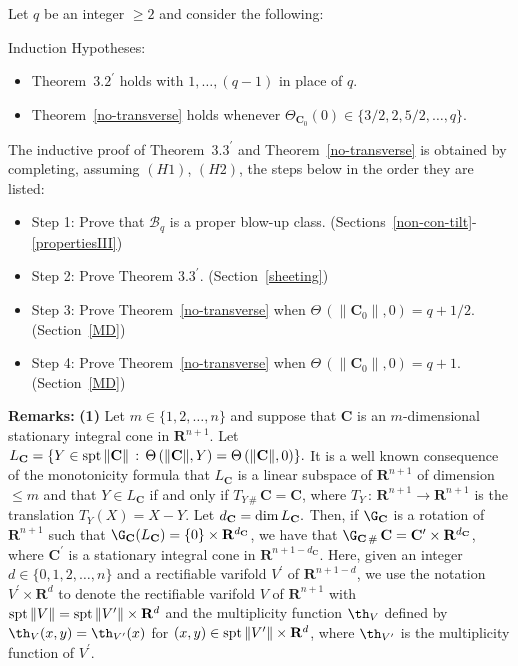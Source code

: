 \documentclass[a4paper,11pt]{amsart}
\begin{document}
Let $q$ be an integer $\geq 2$ and consider the following: 

\noindent
{\sc Induction Hypotheses:}
\begin{itemize}
\item[($H1$)] Theorem~${3.2}^{\prime}$ holds with $1, \ldots, (q-1)$ in place of 
$q.$
\item[($H2$)] Theorem~\ref{no-transverse} holds whenever $\Theta_{{\mathbf C}_{0}}(0) \in \{3/2, 2, 5/2, \ldots, q\}$.
\end{itemize}

\noindent
The inductive proof of Theorem~$3.3^{\prime}$ and Theorem~\ref{no-transverse} is obtained by completing, 
assuming $(H1)$, $(H2)$, the steps below in the order they are listed:
\begin{itemize}
\item[]{\sc Step 1:} Prove that ${\mathcal B}_{q}$ is a proper blow-up class. (Sections~\ref{non-con-tilt}-\ref{propertiesIII})
\item[]{\sc Step 2:} Prove Theorem $3.3^{\prime}$. (Section~\ref{sheeting})
\item[]{\sc Step 3:} Prove Theorem~\ref{no-transverse} when $\Theta \, (\|{\mathbf C}_{0}\|, 0) = q +1/2.$ (Section~\ref{MD})
\item[]{\sc Step 4:} Prove Theorem~\ref{no-transverse} when $\Theta \, (\|{\mathbf C}_{0}\|, 0) = q+1.$ (Section~\ref{MD})
\end{itemize}

\noindent
{\bf Remarks:} {\bf (1)} Let $m \in \{1, 2, \ldots, n\}$ and suppose that ${\mathbf C}$ is an $m$-dimensional stationary integral cone in ${\mathbf R}^{n+1}.$ Let  
$L_{\mathbf C} = \{Y \in {\rm spt} \, \|{\mathbf C}\| \, : \, \Theta \, (\|{\mathbf C}\|, Y) = \Theta \, (\|{\mathbf C}\|, 0)\}.$ It is  a well known consequence of the monotonicity formula that $L_{\mathbf C}$ is a linear subspace of ${\mathbf R}^{n+1}$ of  dimension $\leq m$ and that $Y \in L_{\mathbf C}$ if and only if $T_{Y \, \#} \, {\mathbf C} = {\mathbf C}$, where $T_{Y}\, : \, {\mathbf R}^{n+1} \to {\mathbf R}^{n+1}$ is the translation $T_{Y}(X) = X - Y.$ Let $d_{\mathbf C} = {\rm dim} \, L_{\mathbf C}.$ Then, if $\G_{\mathbf C}$ is a rotation of ${\mathbf R}^{n+1}$ such that $\G_{\mathbf C}(L_{\mathbf C}) = \{0\} \times {\mathbf R}^{d_{\mathbf C}}$, we have that 
$\G_{{\mathbf C} \, \#} \, {\mathbf C} = {\mathbf C}^{\prime} \times {\mathbf R}^{d_{\mathbf C}}$, where ${\mathbf C}^{\prime}$ is a stationary integral cone in ${\mathbf R}^{n+1 - d_{\mathbf C}}.$ Here, given an integer $d \in \{0, 1, 2, \ldots, n\}$ and a rectifiable varifold $V^{\prime}$ of  ${\mathbf R}^{n+1 -d}$, we use the notation $V^{\prime} \times {\mathbf R}^{d}$ to denote the rectifiable varifold $V$ of ${\mathbf R}^{n+1}$ with ${\rm spt} \, \|V\| = {\rm spt} \, \|V^{\prime}\| \times {\mathbf R}^{d}$ and the multiplicity function $\th_{V}$  defined by $\th_{V}(x, y) = \th_{V^{\prime}}(x)$ for $(x, y) \in {\rm spt} \, \|V^{\prime}\| \times {\mathbf R}^{d}$, where $\th_{V^{\prime}}$ is the multiplicity function of $V^{\prime}.$
\end{document}
